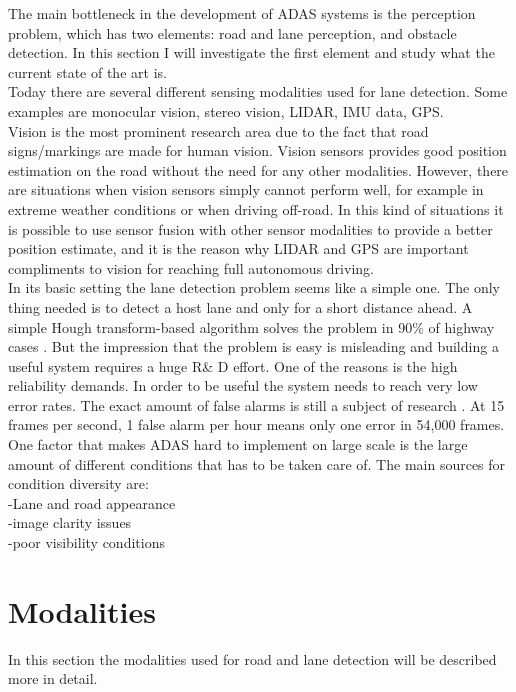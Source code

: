The main bottleneck in the development of ADAS systems is the perception problem, which has two elements: road and lane perception, and obstacle detection. In this section I will investigate the first element and study what the current state of the art is.\\

Today there are several different sensing modalities used for lane detection. Some examples are monocular vision, stereo vision, LIDAR, IMU data, GPS.\\


Vision is the most prominent research area due to the fact that road signs/markings are made for human vision. Vision sensors provides good position estimation on the road without the need for any other modalities. However, there are situations when vision sensors simply cannot perform well, for example in extreme weather conditions or when driving off-road. In this kind of situations it is possible to use sensor fusion with other sensor modalities to provide a better position estimate, and it is the reason why LIDAR and GPS are important compliments to vision for reaching full autonomous driving.\\


In its basic setting the lane detection problem seems like a simple one. The only thing needed is to detect a host lane and only for a short distance ahead. A simple Hough transform-based algorithm solves the problem in 90\% of highway cases \cite{BarHillel2014}. 
But the impression that the problem is easy is misleading and building a useful system requires a huge R\& D effort. One of the reasons is the high reliability demands. In order to be useful the system needs to reach very low error rates. The exact amount of false alarms is still a subject of research \cite{BarHillel2014}.
At 15 frames per second, 1 false alarm per hour means only one error in 54,000 frames.\\


One factor that makes ADAS hard to implement on large scale is the large amount of different conditions that has to be taken care of. The main sources for condition diversity are:\\
-Lane and road appearance\\
-image clarity issues\\
-poor visibility conditions\\

\section{Modalities}
In this section the modalities used for road and lane detection will be described more in detail.


